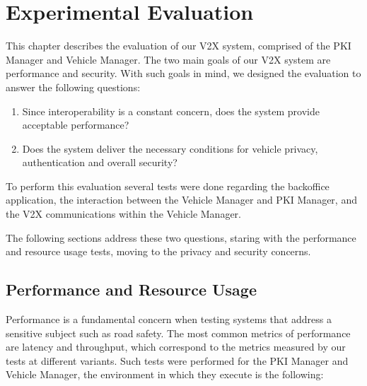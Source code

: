 \chapter{Experimental Evaluation}
\label{chapter:results}

This chapter describes the evaluation of our V2X system, comprised of the PKI Manager and Vehicle Manager. The two main goals of our V2X system are performance and security. With such goals in mind, we designed the evaluation to answer the following questions: 

\begin{enumerate}
	\item Since interoperability is a constant concern, does the system provide acceptable performance? 
	\item Does the system deliver the necessary conditions for vehicle privacy, authentication and overall security?
\end{enumerate}

To perform this evaluation several tests were done regarding the backoffice application, the interaction between the Vehicle Manager and PKI Manager, and the V2X communications within the Vehicle Manager. 

The following sections address these two questions, staring with the performance and resource usage tests, moving to the privacy and security concerns. 

\section{Performance and Resource Usage}
\label{section:performance}
Performance is a fundamental concern when testing systems that address a sensitive subject such as road safety. The most common metrics of performance are latency and throughput, which correspond to the metrics measured by our tests at different variants. Such tests were performed for the PKI Manager and Vehicle Manager, the environment in which they execute is the following: 

